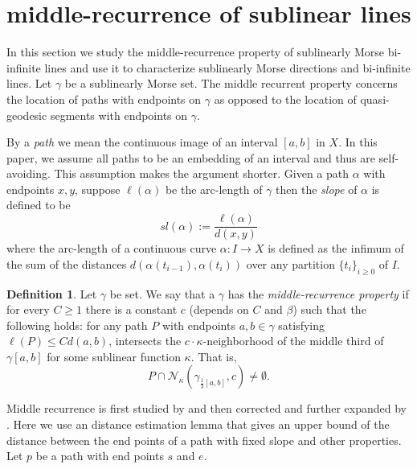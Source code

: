 \documentclass[12 pt]{amsart}
\newcommand{\calN}{\mathcal{N}}
\newcommand{\gothic}{\mathfrak}
\newcommand{\go}{{\gothic o}}
\newtheorem{corollary}[theorem]{Corollary}
\theoremstyle{definition}
\newtheorem{definition}[theorem]{Definition}
\theoremstyle{remark}
\begin{document}

    











\section{middle-recurrence of sublinear lines}
In this section we study the middle-recurrence property of sublinearly Morse bi-infinite lines and use it to characterize sublinearly Morse directions and bi-infinite lines. Let $\gamma$ be a sublinearly Morse set. The middle recurrent property concerns the location of paths with endpoints on $\gamma$ as opposed to the location of quasi-geodesic segments with endpoints on $\gamma$. 

By a \textit{path} we mean the continuous image of an interval $[a, b]$ in $X$. In this paper, we assume all paths to be an embedding of an interval and thus are  self-avoiding. This assumption makes the argument shorter.
Given a path $\alpha$ with endpoints $x, y$, suppose $\ell(\alpha)$ be the arc-length of $\gamma$ then  the \textit{slope} of $\alpha$ is defined to be 
\[ sl(\alpha):= \frac{\ell(\alpha)}{d(x,y)}  \]
where the arc-length of a continuous curve $\alpha: I \rightarrow X$ is defined as the infimum of the sum of the distances $d(\alpha(t_{i-1}), \alpha(t_i))$ over any partition $\{t_i\}_{i\geq0}$ of $I$.
\begin{definition}
Let $\gamma$ be set. We say that a $\gamma$ has the \textit{middle-recurrence property}  if for every $C\geq1$ there is a constant $c$ (depends on $C$ and $\beta$) such that the following holds: 
    for any path $P$ with endpoints $a,b \in \gamma$ satisfying $\ell(P)\leq Cd(a,b)$, intersects the $c\cdot \kappa$-neighborhood of the middle third of $\gamma[a,b]$ for some sublinear function $\kappa$. That is,
\[ P \cap \calN_{\kappa} (\gamma_{\frac 13[a,b]}, c )\neq \emptyset.\]


\end{definition}
Middle recurrence is first studied by \cite{DMS} and then corrected and further expanded by \cite{ADT}. Here we use an distance estimation lemma \cite[Lemma 3.3]{ADT} that gives an upper bound  of the distance between the end points of a path with fixed slope and other properties. Let $p$ be a path with end points $s$ and $e$. 
\end{document}
